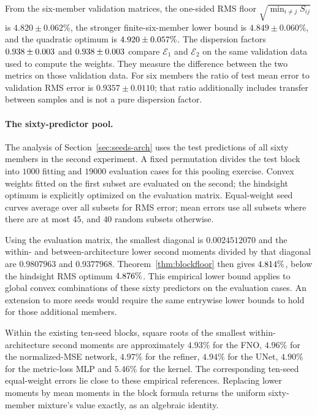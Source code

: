 From the six-member validation matrices, the one-sided
RMS floor $\sqrt{\min_{i\ne j}S_{ij}}$ is $4.820\pm0.062\%$, the stronger
finite-six-member lower bound is $4.849\pm0.060\%$, and the quadratic
optimum is $4.920\pm0.057\%$. The dispersion factors
$0.938\pm0.003$ and $0.938\pm0.003$ compare
$\mathcal E_1$ and $\mathcal E_2$ on the same validation data used to compute
the weights. They measure the difference between the two metrics on those validation data. For six members the ratio of test mean error to validation RMS
error is $0.9357\pm0.0110$; that ratio additionally includes transfer between
samples and is not a pure dispersion factor.

\paragraph{The sixty-predictor pool.} The analysis of
Section~\ref{sec:seeds-arch} uses the test predictions of all sixty
members in the second experiment. A fixed permutation divides
the test block into $1000$ fitting and $19000$ evaluation cases for this
pooling exercise. Convex weights fitted on the first subset
are evaluated on the second; the hindsight optimum is explicitly optimized
on the evaluation matrix. Equal-weight seed curves average over all subsets
for RMS error; mean errors use all subsets where there are at most $45$, and
$40$ random subsets otherwise.

Using the evaluation matrix, the smallest diagonal is $0.0024512070$ and the
within- and between-architecture lower second moments divided by that
diagonal are $0.9807963$ and $0.9377968$. Theorem~\ref{thm:blockfloor} then
gives $4.814\%$, below the hindsight RMS optimum
$4.876\%$. This empirical lower bound applies to global convex combinations of these
sixty predictors on the evaluation cases.
An extension to more seeds would require the same entrywise lower bounds to
hold for those additional members.

Within the existing ten-seed blocks, square roots of the smallest
within-architecture second moments are approximately $4.93\%$ for the FNO,
$4.96\%$ for the normalized-MSE network, $4.97\%$ for the refiner,
$4.94\%$ for the UNet, $4.90\%$ for the metric-loss MLP and $5.46\%$ for
the kernel. The corresponding ten-seed equal-weight errors lie close to
these empirical references. Replacing lower moments by mean moments in the block formula
returns the uniform sixty-member mixture's value exactly, as an algebraic identity.

